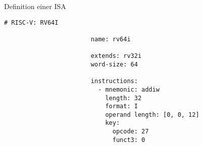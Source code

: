\begin{frame}[fragile]{Definition einer ISA}
  \vspace{-0.5cm}
  \begin{lstlisting}[style=isa]
                        # RISC-V: RV64I

                        name: rv64i

                        extends: rv32i
                        word-size: 64

                        instructions:
                          - mnemonic: addiw
                            length: 32
                            format: I
                            operand length: [0, 0, 12]
                            key:
                              opcode: 27
                              funct3: 0
  \end{lstlisting}
\end{frame}
